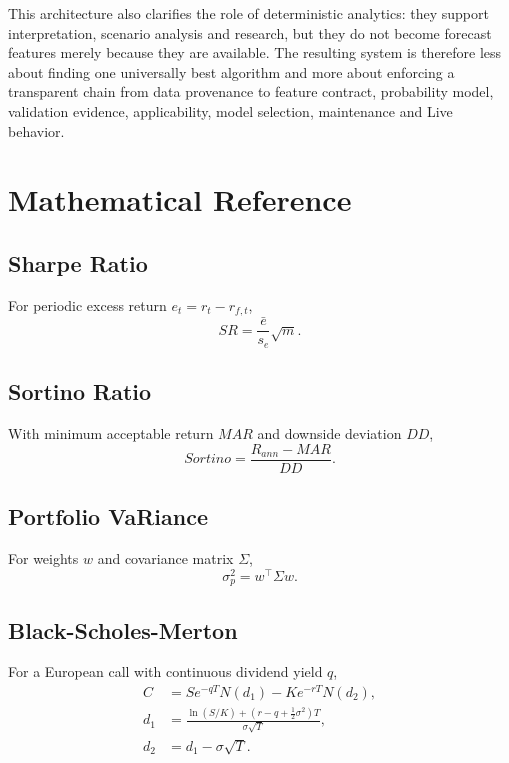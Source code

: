 \documentclass[11pt]{article}
\begin{document}
This architecture also clarifies the role of deterministic analytics: they support interpretation, scenario analysis and research, but they do not become forecast features merely because they are available. The resulting system is therefore less about finding one universally best algorithm and more about enforcing a transparent chain from data provenance to feature contract, probability model, validation evidence, applicability, model selection, maintenance and Live behavior.

\appendix
\section{Mathematical Reference}
\subsection{Sharpe Ratio}
For periodic excess return $e_t=r_t-r_{f,t}$,
\begin{equation}
SR=\frac{\bar e}{s_e}\sqrt{m}.
\end{equation}

\subsection{Sortino Ratio}
With minimum acceptable return $MAR$ and downside deviation $DD$,
\begin{equation}
Sortino=\frac{R_{ann}-MAR}{DD}.
\end{equation}

\subsection{Portfolio VaRiance}
For weights $w$ and covariance matrix $\Sigma$,
\begin{equation}
\sigma_p^2=w^\top\Sigma w.
\end{equation}

\subsection{Black-Scholes-Merton}
For a European call with continuous dividend yield $q$,
\begin{align}
C &= Se^{-qT}N(d_1)-Ke^{-rT}N(d_2),\\
d_1 &= \frac{\ln(S/K)+(r-q+\tfrac12\sigma^2)T}{\sigma\sqrt{T}},\\
d_2 &= d_1-\sigma\sqrt{T}.
\end{align}
\end{document}
